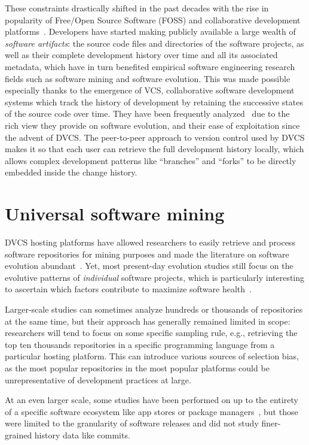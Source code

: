 These constraints drastically shifted in the past decades with the rise in
popularity of Free/Open Source Software (FOSS) and collaborative development
platforms~\cite{kalliamvakou2014promises}. Developers have started making
publicly available a large wealth of \emph{software artifacts}: the source code
files and directories of the software projects, as well as their complete
development history over time and all its associated metadata, which have in
turn benefited empirical software engineering research fields such as software
mining and software evolution. This was made possible especially thanks to the
emergence of \gls{VCS}, collaborative software development systems which track
the history of development by retaining the successive states of the source
code over time. They have been frequently analyzed~\cite{kagdi2007msrsurvey}
due to the rich view they provide on software evolution, and their ease of
exploitation since the advent of \gls{DVCS}. The peer-to-peer approach to
version control used by \gls{DVCS} makes it so that each user can retrieve the
full development history locally, which allows complex development patterns
like ``branches'' and ``forks'' to be directly embedded inside the change
history.

\section{Universal software mining}

\gls{DVCS} hosting platforms have allowed researchers to easily retrieve and
process software repositories for mining purposes and made the literature on
software evolution abundant~\cite{herraiz2013evolution}. Yet, most present-day
evolution studies still focus on the evolutive patterns of \emph{individual}
software projects, which is particularly interesting to ascertain which factors
contribute to maximize software health~\cite{DBLP:conf/icse/2018soheal}.

Larger-scale studies can sometimes analyze hundreds or thousands of
repositories at the same time, but their approach has generally remained
limited in scope: researchers will tend to focus on some specific sampling
rule, e.g., retrieving the top ten thousands repositories in a specific
programming language from a particular hosting platform. This can introduce
various sources of selection bias, as the most popular repositories in the most
popular platforms could be unrepresentative of development practices at large.

At an even larger scale, some studies have been performed on up to the entirety
of a specific software ecosystem like app stores or package
managers~\cite{gonzalez2009macro,debsources-ese-2016}, but those were limited
to the granularity of software releases and did not study finer-grained history
data like commits.

